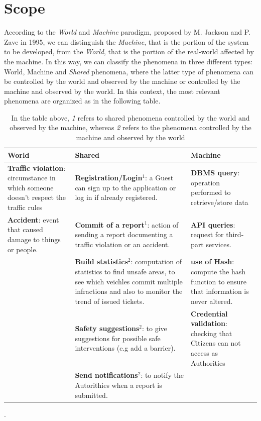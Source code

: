 \documentclass{report}
\begin{document}
\section{Scope}
According to the \textit{World} and \textit{Machine} paradigm, proposed by M. Jackson and P. Zave in 1995, we can distinguish the \textit{Machine}, that is the portion of the system to be developed, from the \textit{World}, that is the portion of the real-world affected by the machine. In this way, we can classify the phenomena in three different types: World, Machine and \textit{Shared} phenomena, where the latter type of phenomena can be controlled by the world and observed by the machine or controlled by the machine and observed by the world.
\newline
In this context, the most relevant phenomena are organized as in the following table.
\begin{table}[!ht]
		\begin{center}
		\begin{tabular}{|C{3.5cm}||C{3.5cm}||C{3.5cm}|}
			\toprule
			\textbf{World} &\textbf{Shared}& \textbf{Machine}\\
			\midrule
			\textbf{Traffic violation}: circumstance in which someone doesn't respect the traffic rules &\textbf{Registration/Login}$^{1}$: a Guest can sign up to the application or log in if already registered.&\textbf{DBMS query}: operation performed to retrieve/store data\\
			\midrule
			\textbf{Accident}: event that caused damage to things or people.&\textbf{Commit of a report}$^{1}$: action of sending a report documenting a traffic violation or an accident.&\textbf{API queries}: request for third-part services.\\
			\midrule
			&\textbf{Build statistics}$^{2}$: computation of statistics to find unsafe areas, to see which veichles commit multiple infractions and also to monitor the trend of issued tickets.&\textbf{use of Hash}: compute the hash function to ensure that information is never altered.\\
			\midrule
			&\textbf{Safety suggestions}$^{2}$: to give suggestions for possible safe interventions (e.g add a barrier).&\textbf{Credential validation}: checking that Citizens can not access as Authorities\\ 
			\midrule
			\midrule
			&\textbf{Send notifications}$^{2}$: to notify the Autorithies when a report is submitted.&\\
			\bottomrule
		\end{tabular}
		\end{center}
		\caption{In the table above, \textit{1} refers to shared phenomena controlled by the world and observed by the machine, whereas \textit{2} refers to the phenomena controlled by the machine and observed by the world}.
		\label{tab:multicol}
	\end{table}
	
\end{document}
